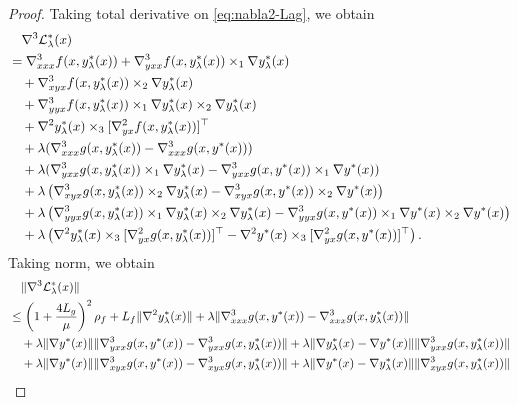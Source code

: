 \begin{proof}
Taking total derivative on \eqref{eq:nabla2-Lag}, we obtain
{
\begin{align*}
     &\quad \nabla^3 {\mathcal{L}}_{\lambda}^*(x) \\ 
    &= \nabla_{xxx}^3 f(x,y_{\lambda}^*(x)) + \nabla_{yxx}^3 f(x,y_{\lambda}^*(x)) \times_1 \nabla y_{\lambda}^*(x)  \\
    &\quad  +  \nabla_{xyx}^3 f(x,y_{\lambda}^*(x)) \times_2 \nabla y_{\lambda}^*(x) \\
    &\quad +  \nabla_{yyx}^3 f(x,y_{\lambda}^*(x)) \times_1 \nabla y_{\lambda}^*(x) \times_2 \nabla y_{\lambda}^*(x) \\
    &\quad +\nabla^2 y_{\lambda}^*(x) \times_3 [\nabla_{yx}^2 f(x,y_{\lambda}^*(x))]^\top \\
    &\quad + \lambda ( \nabla_{xxx}^3 g(x,y_{\lambda}^*(x)) - \nabla_{xxx}^3 g(x,y^*(x)) ) \\
    &\quad + \lambda ( 
    \nabla_{yxx}^3 g(x,y_{\lambda}^*(x)) \times_1 \nabla y_{\lambda}^*(x) - \nabla_{yxx}^3 g(x,y^*(x)) \times_1 \nabla y^*(x) 
    ) \\
    &\quad + \lambda \left(  \nabla_{xyx}^3 g(x,y_{\lambda}^*(x)) \times_2 \nabla y_{\lambda}^*(x) - \nabla_{xyx}^3 g(x,y^*(x))   \times_2 \nabla y^*(x) \right)  \\
    &\quad + \lambda \left( 
     \nabla_{yyx}^3 g(x,y_{\lambda}^*(x)) \times_1 \nabla y_{\lambda}^*(x) \times_2  \nabla y_{\lambda}^*(x)   - 
    \nabla_{yyx}^3 g(x,y^*(x)) \times_1 \nabla y^*(x)  \times_2 \nabla y^*(x)
    \right) \\
    &\quad + \lambda \left(  \nabla^2 y_{\lambda}^*(x) \times_3 [\nabla_{yx}^2 g(x,y_{\lambda}^*(x))]^\top -  \nabla^2 y^*(x) \times_3 [\nabla_{yx}^2 g(x,y^*(x))]^\top\right)
    .
\end{align*}}
Taking norm, we obtain
\begin{align*}
    &\quad \Vert \nabla^3 \fL_{\lambda}^* (x) \Vert\\
    &\le \left( 1 + \frac{4L_g}{\mu}\right)^2\rho_f + L_f \Vert \nabla^2 y_{\lambda}^*(x) \Vert +\lambda \Vert 
    \nabla_{xxx}^3 g(x,y^*(x)) - 
    \nabla_{xxx}^3 g(x,y_{\lambda}^*(x))\Vert  \\
    &\quad + \lambda \Vert \nabla y^*(x) \Vert \Vert \nabla_{yxx}^3 g(x,y^*(x)) - \nabla_{yxx}^3 g(x,y_{\lambda}^*(x)) \Vert + \lambda \Vert \nabla y_{\lambda}^*(x) - \nabla y^*(x) \Vert \Vert \nabla_{yxx}^3 g(x,y_{\lambda}^*(x)) \Vert \\
    &\quad + \lambda \Vert \nabla y^*(x) \Vert \Vert \nabla_{xyx}^3 g(x,y^*(x)) - \nabla_{xyx}^3 g(x,y_{\lambda}^*(x)) \Vert  + \lambda \Vert \nabla y^*(x) - \nabla y_{\lambda}^*(x) \Vert \Vert \nabla_{xyx}^3 g(x,y_{\lambda}^*(x)) \Vert \\

\end{align*}
\end{proof}
